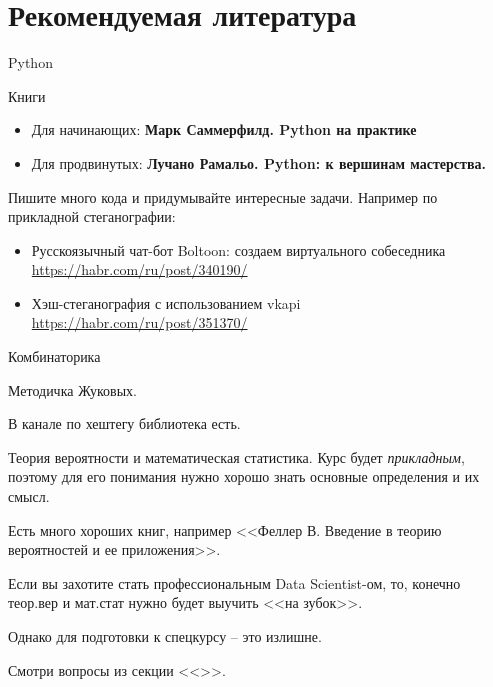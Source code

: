 \documentclass{beamer}
\begin{document}
  
  
  \section{Рекомендуемая литература}\label{section:literature}
  
  \begin{frame}{Python}
  
  Книги
  \begin{itemize}
  	\item Для начинающих: 
  	\textbf{Марк Саммерфилд. Python на практике} 
  	\item 
  	Для продвинутых:
  	\textbf{Лучано Рамальо. Python: к вершинам мастерства.}
  \end{itemize}
  
  Пишите много кода и придумывайте интересные задачи. 
  Например по прикладной стеганографии:
  \begin{itemize}
  	\item Русскоязычный чат-бот Boltoon: создаем виртуального собеседника
  	\url{https://habr.com/ru/post/340190/}
  	\item Хэш-стеганография с использованием vkapi
  	\url{https://habr.com/ru/post/351370/}
  \end{itemize}
\end{frame}
	
	\begin{frame}{Комбинаторика}
	
	Методичка Жуковых. 
	
	В канале по хештегу библиотека есть.
	
	\end{frame}

\begin{frame}{Теория вероятности и математическая статистика.}
Курс будет \textit{прикладным}, поэтому для его понимания 
нужно хорошо знать основные определения и их смысл.

Есть много хороших книг, например 
<<Феллер В. Введение в теорию вероятностей и ее приложения>>.

Если вы захотите стать профессиональным Data Scientist-ом,
то, конечно теор.вер и мат.стат нужно будет выучить <<на зубок>>.

Однако для подготовки к спецкурсу -- это излишне.

Смотри вопросы из секции <<>>.
\end{frame}

   
  
\end{document}
